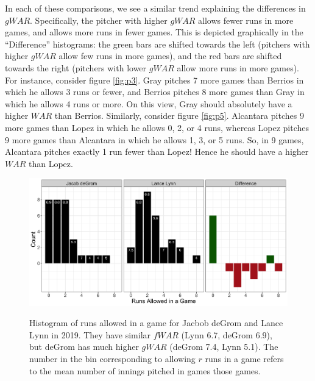 \documentclass[12pt]{article}
\begin{document}
In each of these comparisons, we see a similar trend explaining the differences in $gWAR$. Specifically, the pitcher with higher $gWAR$ allows fewer runs in more games, and allows more runs in fewer games. This is depicted graphically in the ``Difference'' histograms: the green bars are shifted towards the left (pitchers with higher $gWAR$ allow few runs in more games), and the red bars are shifted towards the right (pitchers with lower $gWAR$ allow more runs in more games). For instance, consider figure \ref{fig:p3}. Gray pitches 7 more games than Berrios in which he allows 3 runs or fewer, and Berrios pitches 8 more games than Gray in which he allows 4 runs or more. On this view, Gray should absolutely have a higher $WAR$ than Berrios. Similarly, consider figure \ref{fig:p5}. Alcantara pitches 9 more games than Lopez in which he allows 0, 2, or 4 runs, whereas Lopez pitches 9 more games than Alcantara in which he allows 1, 3, or 5 runs. So, in 9 games, Alcantara pitches exactly 1 run fewer than Lopez! Hence he should have a higher $WAR$ than Lopez. 

\begin{figure}[t!]
\centering
\caption{Histogram of runs allowed in a game for Jacbob deGrom and Lance Lynn in 2019. They have similar $fWAR$ (Lynn 6.7, deGrom 6.9), but deGrom has much higher $gWAR$ (deGrom 7.4, Lynn 5.1). The number in the bin corresponding to allowing $r$ runs in a game refers to the mean number of innings pitched in games those games.} 
\includegraphics[width=15cm]{../writeup_plots/p2_2019.png}
\label{fig:p2}
\end{figure}
\end{document}
